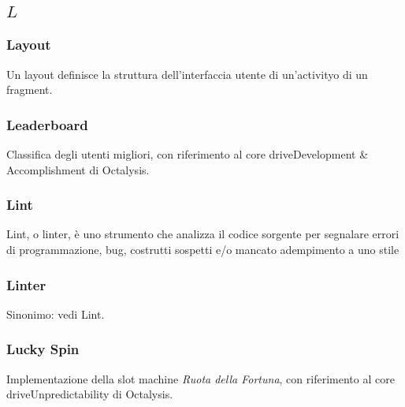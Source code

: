 \subsection*{\quad$L\quad$}
\subsubsection*{Layout}
Un layout definisce la struttura dell'interfaccia utente di un'activity\glosp o di un fragment\glo.

\subsubsection*{Leaderboard}
Classifica degli utenti migliori, con riferimento al core drive\glosp Development \& Accomplishment di Octalysis\glo.

\subsubsection*{Lint}
Lint, o linter, è uno strumento che analizza il codice sorgente per segnalare errori di programmazione, bug, costrutti sospetti e/o mancato adempimento a uno stile
\subsubsection*{Linter}
Sinonimo: vedi Lint\glo.

\subsubsection*{Lucky Spin}
Implementazione della slot machine \textit{Ruota della Fortuna}, con riferimento al core drive\glosp Unpredictability di Octalysis\glo.